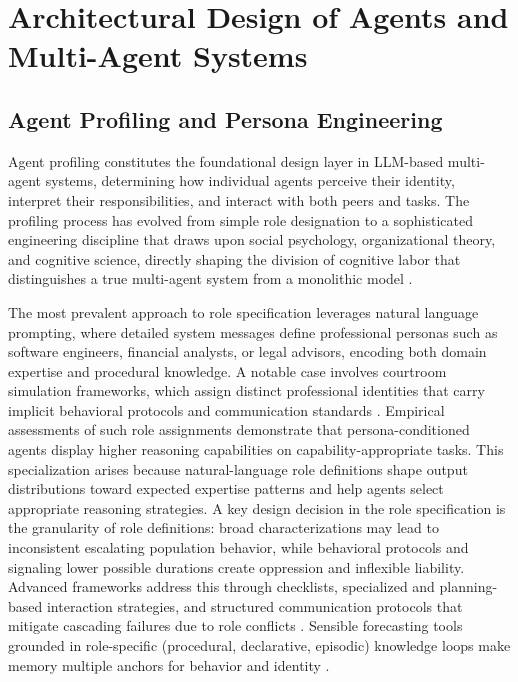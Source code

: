 \documentclass[11pt,a4paper]{article}
\begin{document}
\section{Architectural Design of Agents and Multi-Agent Systems}



\subsection{Agent Profiling and Persona Engineering}


Agent profiling constitutes the foundational design layer in LLM-based multi-agent systems, determining how individual agents perceive their identity, interpret their responsibilities, and interact with both peers and tasks. The profiling process has evolved from simple role designation to a sophisticated engineering discipline that draws upon social psychology, organizational theory, and cognitive science, directly shaping the division of cognitive labor that distinguishes a true multi-agent system from a monolithic model \cite{arxiv:2402.01680v2}.

The most prevalent approach to role specification leverages natural language prompting, where detailed system messages define professional personas such as software engineers, financial analysts, or legal advisors, encoding both domain expertise and procedural knowledge. A notable case involves courtroom simulation frameworks, which assign distinct professional identities that carry implicit behavioral protocols and communication standards \cite{arxiv:2306.03314v1}. Empirical assessments of such role assignments demonstrate that persona-conditioned agents display higher reasoning capabilities on capability-appropriate tasks. This specialization arises because natural-language role definitions shape output distributions toward expected expertise patterns and help agents select appropriate reasoning strategies. A key design decision in the role specification is the granularity of role definitions: broad characterizations may lead to inconsistent escalating population behavior, while behavioral protocols and signaling lower possible durations create oppression and inflexible liability. Advanced frameworks address this through checklists, specialized and planning-based interaction strategies, and structured communication protocols that mitigate cascading failures due to role conflicts \cite{arxiv:2310.02124v2} \cite{arxiv:2310.02170v1}. Sensible forecasting tools grounded in role-specific (procedural, declarative, episodic) knowledge loops make memory multiple anchors for behavior and identity \cite{arxiv:2401.02777v2,arxiv:2404.13501v1}.
\end{document}
